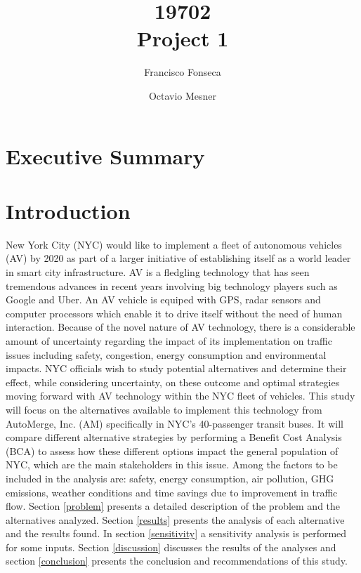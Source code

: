 \documentclass[11pt, letterpaper]{article}
\title{\vspace{-2cm} 19702 \\ Project 1}
\author{Francisco Fonseca \and Octavio Mesner}
\date{\mydate}
\date{\mydateformat\normalsize\mydate} %
\begin{document}

\section*{Executive Summary} \label{execsum}

\pagebreak
\section{Introduction} \label{intro}

New York City (NYC) would like to implement a fleet of autonomous
vehicles (AV) by 2020 as part of a larger initiative of establishing
itself as a world leader in smart city infrastructure. AV is a fledgling technology
that has seen tremendous advances in recent years involving
big technology players such as Google and Uber. An AV vehicle is equiped with
GPS, radar sensors and computer processors which enable it to drive itself without the
need of human interaction. Because of the
novel nature of AV technology, there is a considerable amount of
uncertainty regarding the impact of its implementation on traffic
issues including safety, congestion, energy consumption and environmental impacts.
NYC officials wish to study potential alternatives and determine their effect, while
considering uncertainty, on these outcome
and optimal strategies moving forward with AV
technology within the NYC fleet of vehicles. This study will focus on
the alternatives available to implement  this technology
from AutoMerge, Inc. (AM) specifically in NYC's 40-passenger transit
buses. It will compare different alternative strategies by performing
a Benefit Cost Analysis (BCA) to assess how these different options
impact the general population of NYC, which are the main stakeholders
in this issue. Among the factors to be included in the analysis are:
safety, energy consumption, air pollution, GHG emissions, weather
conditions and time savings due to improvement in traffic flow. Section \ref{problem}
presents a detailed description of the problem and the alternatives analyzed. Section
\ref{results} presents the analysis of each alternative and the
results found. In section \ref{sensitivity} a sensitivity analysis is
performed for some inputs. Section \ref{discussion} discusses the
results of the analyses and section \ref{conclusion} presents the
conclusion and recommendations of this study.
\end{document}
